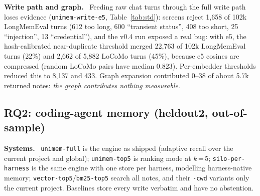 \documentclass[10pt,twocolumn]{article}
\newcommand{\code}[1]{\texttt{\small #1}}
\newcommand{\para}[1]{\smallskip\noindent\textbf{#1}\ }
\begin{document}
\para{Write path and graph.} Feeding raw chat turns through the full write path loses evidence (\code{unimem-write-e5},
Table~\ref{tab:std}): screens reject 1,658 of 102k LongMemEval turns (612 too long, 600 ``transient status'', 408 too
short, 25 ``injection'', 13 ``credential''), and the v0.4 run exposed a real bug: with e5, the hash-calibrated
near-duplicate threshold merged 22,763 of 102k LongMemEval turns (22\%) and 2,662 of 5,882 LoCoMo turns (45\%), because
e5 cosines are compressed (random LoCoMo pairs have median 0.823). Per-embedder thresholds reduced this to 8,137 and
433. Graph expansion contributed 0--38 of about 5.7k returned notes: \emph{the graph contributes nothing measurable}.

\subsection{RQ2: coding-agent memory (heldout2, out-of-sample)}
\label{sec:rq2}

\para{Systems.} \code{unimem-full} is the engine as shipped (adaptive recall over the current project and global);
\code{unimem-top5} is ranking mode at $k$\,=\,5; \code{silo-per-harness} is the same engine with one store per
harness, modelling harness-native memory; \code{vector-top5}/\code{bm25-top5} search all notes, and their \code{-cwd}
variants only the current project. Baselines store every write verbatim and have no abstention.
\end{document}
